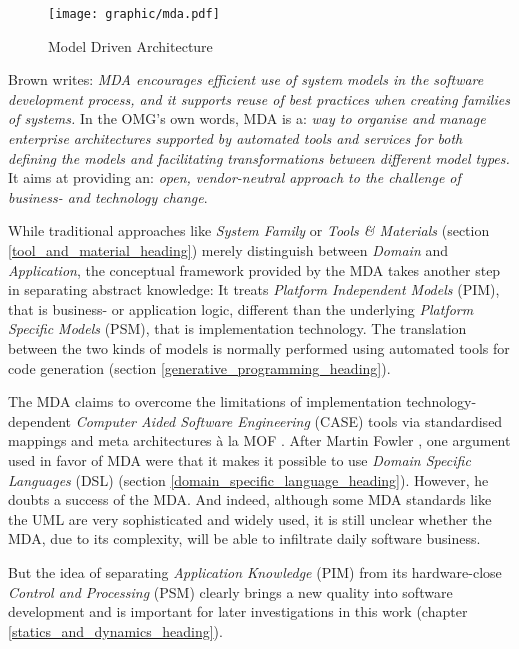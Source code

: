 \begin{figure}[ht]
    \begin{center}
        \texttt{[image: graphic/mda.pdf]}
        \caption{Model Driven Architecture \cite{mda}}
        \label{mda_figure}
    \end{center}
\end{figure}

Brown \cite{brown2004} writes: \textit{MDA encourages efficient use of system
models in the software development process, and it supports reuse of best
practices when creating families of systems.} In the OMG's own words, MDA is a:
\textit{way to organise and manage enterprise architectures supported by
automated tools and services for both defining the models and facilitating
transformations between different model types.} It aims at providing an:
\textit{open, vendor-neutral approach to the challenge of business- and
technology change}.

While traditional approaches like \emph{System Family} or
\emph{Tools \& Materials} (section \ref{tool_and_material_heading}) merely
distinguish between \emph{Domain} and \emph{Application}, the conceptual
framework provided by the MDA takes another step in separating abstract
knowledge: It treats \emph{Platform Independent Models} (PIM), that is
business- or application logic, different than the underlying
\emph{Platform Specific Models} (PSM), that is implementation technology. The
translation between the two kinds of models is normally performed using
automated tools for code generation (section \ref{generative_programming_heading}).

The MDA claims to overcome the limitations of implementation
technology-dependent \emph{Computer Aided Software Engineering} (CASE) tools
via standardised mappings and meta architectures \`a la MOF \cite{frankel}.
After Martin Fowler \cite{fowlerdsl}, one argument used in favor of MDA were
that it makes it possible to use \emph{Domain Specific Languages} (DSL)
(section \ref{domain_specific_language_heading}). However, he doubts a success
of the MDA. And indeed, although some MDA standards like the UML are very
sophisticated and widely used, it is still unclear whether the MDA, due to its
complexity, will be able to infiltrate daily software business.

But the idea of separating \emph{Application Knowledge} (PIM) from its
hardware-close \emph{Control and Processing} (PSM) clearly brings a new quality
into software development and is important for later investigations in this
work (chapter \ref{statics_and_dynamics_heading}).
